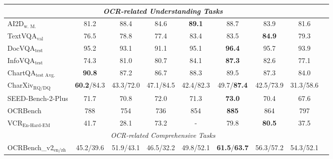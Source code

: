 \begin{table}[h]
{\begin{tabular}{@{}lcccccccc@{}}
\midrule
\multicolumn{8}{c}{\textit{OCR-related Understanding Tasks}} \\
\midrule
AI2D$_{\text{w. M.}}$ & 81.2 & 88.4 & 84.6 & \textbf{89.1} & 88.7 & 83.9 & 81.6  \\ 
TextVQA$_{\text{val}}$ & 76.5  & 78.8 & 77.4 & 83.4 & 83.5 & \textbf{84.9} & 79.3  \\ 
DocVQA$_{\text{test}}$ & 95.2   & 93.1 & 91.1 &95.1 &   \textbf{96.4} & 95.7 & 93.9     \\     
InfoVQA$_{\text{test}}$ & 74.3 & 81.0 & 80.7 & 84.1 & \textbf{87.3} & 82.6 & 77.1  \\ 
ChartQA$_{\text{test Avg.}}$ & \textbf{90.8} & 87.2 & 86.7 & 88.3 & 89.5 & 87.3 & 84.0  \\ 
CharXiv$_{\text{RQ/DQ}}$ & \textbf{60.2}/84.3  & 43.3/72.0 & 47.1/84.5 & 42.4/82.3 & 49.7/\textbf{87.4} & 42.5/73.9 & 31.3/58.6  \\ 
SEED-Bench-2-Plus  & 71.7 & 70.8 & 72.0 & 71.3 & \textbf{73.0} & 70.4 & 67.6  \\ 
OCRBench  & 788 & 754 & 736 & 854 &  \textbf{885} & 864 & 797  \\
VCR$_{\text{En-Hard-EM}}$  & 41.7 & 28.1 & 73.2 & - & 79.8 & \textbf{80.5} & 37.5  \\
\midrule
\multicolumn{8}{c}{\textit{OCR-related Comprehensive Tasks}} \\
\midrule
OCRBench\_v2$_{\text{en/zh}}$ & 45.2/39.6 & 51.9/43.1    & 46.5/32.2   & 49.8/52.1 & \textbf{61.5}/\textbf{63.7} & 56.3/57.2 & 54.3/52.1  \\ 
\bottomrule
\end{tabular}
}
\end{table}